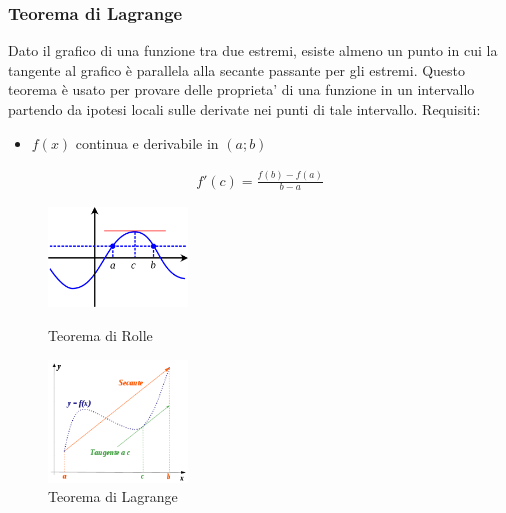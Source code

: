 \documentclass[a4paper]{article}
\begin{document}
	\subsubsection{Teorema di Lagrange}
	Dato il grafico di una funzione tra due estremi, esiste almeno un punto in cui la tangente al grafico è parallela alla secante passante per gli estremi.
	Questo teorema è usato per provare delle proprieta' di una funzione in un intervallo partendo da ipotesi locali sulle derivate nei punti di tale intervallo.
	Requisiti:
	\begin{itemize}
		\item $f(x)$ continua e derivabile in $(a;b)$
	\end{itemize}
	\begin{align*}
	f'(c)= \frac{f(b)-f(a)}{b-a}
	\end{align*}
	\begin{center}
	\begin{figure}[htpb]
		\begin{minipage}[H]{0.47\textwidth}
			\centering
			\includegraphics[width=3.7cm]{rolle.png}
			\caption{\label{f_etichetta1}Teorema di Rolle}
		\end{minipage}
		\hfill
		\begin{minipage}[H]{0.47\textwidth}
			\centering
			\includegraphics[width=3.7cm]{lagrange.png}
			\caption{\label{f_etichetta1}Teorema di Lagrange}
		\end{minipage}
	\end{figure}
		
	\end{center}
	
	\newpage
\end{document}
